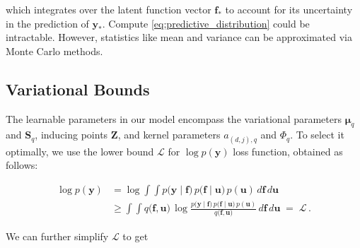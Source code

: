 which integrates over the latent function vector $\boldsymbol{f}_*$ to account for its uncertainty in the prediction of $\boldsymbol{y}_*$. Compute \cref{eq;predictive_distribution} could be intractable. However, statistics like mean and variance can be approximated via Monte Carlo methods.

\subsection{Variational Bounds}

The learnable parameters in our model encompass the variational parameters \( \boldsymbol{\mu}_q \) and \( \boldsymbol{S}_{q} \), inducing points \( \boldsymbol{Z}\), and kernel parameters \( a_{(d,j), q}\) and \( \Phi_q \). To select it optimally, we use the lower bound $\mathcal{L}$ for $\log p(\mathbf{y})$ loss function, obtained as follows:

\begin{equation}
	\begin{split}
		\log p(\boldsymbol{y})
		&= \log \int\!\!\int p\bigl(\boldsymbol{y}\mid\boldsymbol{f}\bigr)\,
		p\bigl(\boldsymbol{f}\mid\boldsymbol{u}\bigr)\,
		p(\boldsymbol{u})
		\,d\boldsymbol{f}\,d\boldsymbol{u}
		\\[6pt]
		&\ge
		\int\!\!\int q\bigl(\boldsymbol{f},\boldsymbol{u}\bigr)\,
		\log \frac{p\bigl(\boldsymbol{y}\mid\boldsymbol{f}\bigr)\,
			p\bigl(\boldsymbol{f}\mid\boldsymbol{u}\bigr)\,
			p(\boldsymbol{u})}
		{q\bigl(\boldsymbol{f},\boldsymbol{u}\bigr)}
		\,d\boldsymbol{f}\,d\boldsymbol{u}
		\;=\;\mathcal{L}\,.
	\end{split}
\end{equation}


We can further simplify $\mathcal{L}$ to get

